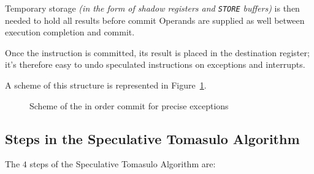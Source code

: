 \documentclass[english]{article}
\begin{document}
Temporary storage \textit{(in the form of shadow registers and \texttt{STORE} buffers)} is then needed to hold all results before commit
Operands are supplied as well between execution completion and commit.

Once the instruction is committed, its result is placed in the destination register;
it's therefore easy to undo speculated instructions on exceptions and interrupts.

A scheme of this structure is represented in Figure~\ref{fig:exceptions-in-order-commit}.

\begin{figure}[htbp]
  \bigskip
  \centering
  \caption{Scheme of the in order commit for precise exceptions}
  \label{fig:exceptions-in-order-commit}
  \bigskip
\end{figure}

\subsection{Steps in the Speculative Tomasulo Algorithm}

The \(4\) steps of the Speculative Tomasulo Algorithm are:
\end{document}
